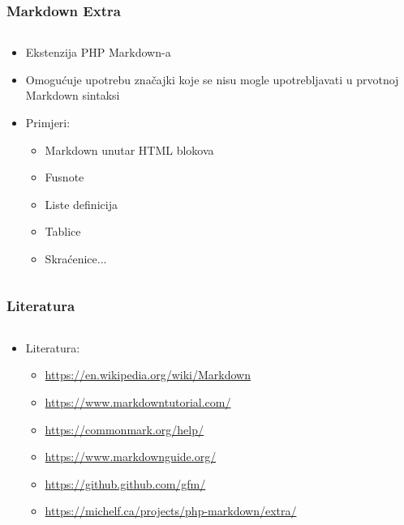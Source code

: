 \documentclass{beamer}
\begin{document}
\begin{frame}
	\frametitle{Markdown Extra}

 	\begin{minipage}[0.2\textheight]{\textwidth}
 	\begin{columns}[T]
 	\begin{column}{0.8\textwidth}
 	\begin{itemize}
 		\item{Ekstenzija PHP Markdown-a}
		\item{Omogućuje upotrebu značajki koje se nisu mogle upotrebljavati u prvotnoj Markdown sintaksi}
		\item{Primjeri: 
		\begin{itemize}
			\item{Markdown unutar HTML blokova}
			\item{Fusnote}
			\item{Liste definicija}
			\item{Tablice}
			\item{Skraćenice}...
		\end{itemize}}
	\end{itemize}
	\end{column}
	\end{columns}
	\end{minipage}

\end{frame}

\begin{frame}
	\frametitle{Literatura}

 	\begin{minipage}[0.2\textheight]{\textwidth}
 	\begin{columns}[T]
 	\begin{column}{0.8\textwidth}
 	\begin{itemize}
 		\item{Literatura:
 		\begin{itemize}
 			\item{\url{https://en.wikipedia.org/wiki/Markdown}}
 			\item{\url{https://www.markdowntutorial.com/}}
 			\item{\url{https://commonmark.org/help/}}
 			\item{\url{https://www.markdownguide.org/}}
 			\item{\url{https://github.github.com/gfm/}}
 			\item{\url{https://michelf.ca/projects/php-markdown/extra/}}
 		\end{itemize}}
	\end{itemize}
	\end{column}
	\end{columns}
	\end{minipage}

\end{frame}
\end{document}
